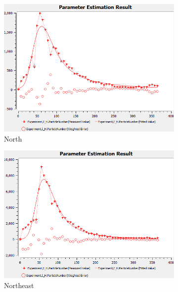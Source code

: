 \documentclass[10pt,letterpaper]{article}
\begin{document}
\begin{figure}
     \centering
     \begin{subfigure}[b]{0.3\textwidth}
         \centering
         \includegraphics[width=\textwidth]{Zika_PE_figs/north_PE_0419.png}
         \caption{North}
         \label{fig:north_PE}
     \end{subfigure}
     \hfill
     \begin{subfigure}[b]{0.3\textwidth}
         \centering
         \includegraphics[width=\textwidth]{Zika_PE_figs/northeast_PE_0419.png}
         \caption{Northeast}
         \label{fig:NE_PE}
     \end{subfigure}
     \hfill
     \begin{subfigure}[b]{0.3\textwidth}

\end{subfigure}
\end{figure}
\end{document}
